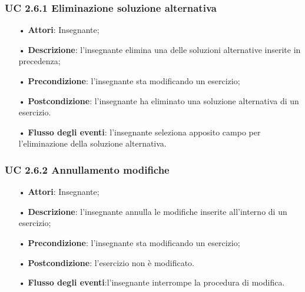 \subsubsection{UC 2.6.1 Eliminazione soluzione alternativa}
\begin{itemize}
	\item[•] \textbf{Attori}: Insegnante;
	\item[•] \textbf{Descrizione}: l'insegnante elimina una delle soluzioni alternative inserite in precedenza;
	\item[•] \textbf{Precondizione}: l'insegnante sta modificando un esercizio;
	\item[•] \textbf{Postcondizione}: l'insegnante ha eliminato una soluzione alternativa di un esercizio.
	\item[•] \textbf{Flusso degli eventi}: l'insegnante seleziona apposito campo per l'eliminazione della soluzione alternativa.
\end{itemize}

\subsubsection{UC 2.6.2 Annullamento modifiche}
\begin{itemize}
	\item[•] \textbf{Attori}: Insegnante;
	\item[•] \textbf{Descrizione}: l'insegnante annulla le modifiche inserite all'interno di un esercizio; 
	\item[•] \textbf{Precondizione}: l'insegnante sta modificando un esercizio;
	\item[•] \textbf{Postcondizione}: l'esercizio non è modificato.
	\item[•] \textbf{Flusso degli eventi}:l'insegnante interrompe la procedura di modifica.
\end{itemize}

